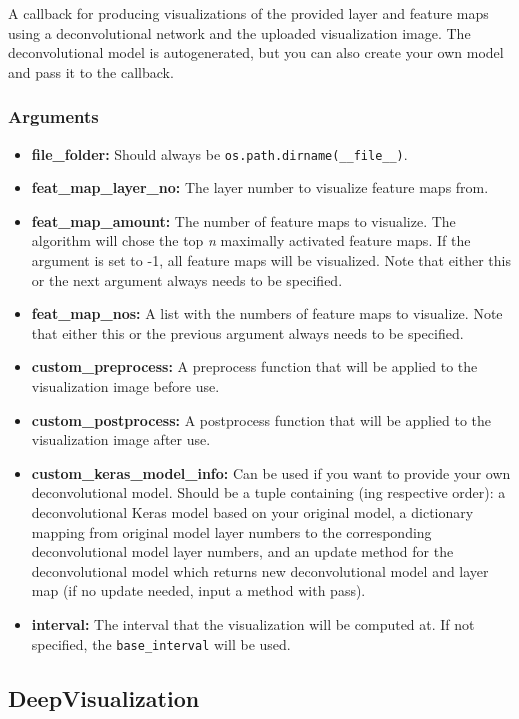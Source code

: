 \noindent A callback for producing visualizations of the provided layer and feature maps using a deconvolutional network and the uploaded visualization image. The deconvolutional model is autogenerated, but you can also create your own model and pass it to the callback.

\subsubsection*{Arguments}

\begin{itemize}
    \item \textbf{file\_folder:} Should always be \texttt{os.path.dirname(\_\_file\_\_)}.
    \item \textbf{feat\_map\_layer\_no:} The layer number to visualize feature maps from.
    \item \textbf{feat\_map\_amount:} The number of feature maps to visualize. The algorithm will chose the top \textit{n} maximally activated feature maps. If the argument is set to -1, all feature maps will be visualized. Note that either this or the next argument always needs to be specified.
    \item \textbf{feat\_map\_nos:} A list with the numbers of feature maps to visualize. Note that either this or the previous argument always needs to be specified.
    \item \textbf{custom\_preprocess:} A preprocess function that will be applied to the visualization image before use.
    \item \textbf{custom\_postprocess:} A postprocess function that will be applied to the visualization image after use.
    \item \textbf{custom\_keras\_model\_info:} Can be used if you want to provide your own deconvolutional model. Should be a tuple containing (ing respective order): a deconvolutional Keras model based on your original model, a dictionary mapping from original model layer numbers to the corresponding deconvolutional model layer numbers, and an update method for the deconvolutional model which returns new deconvolutional model and layer map (if no update needed, input a method with pass).
    \item \textbf{interval:} The interval that the visualization will be computed at. If not specified, the \texttt{base\_interval} will be used.
\end{itemize}

\subsection*{DeepVisualization}

